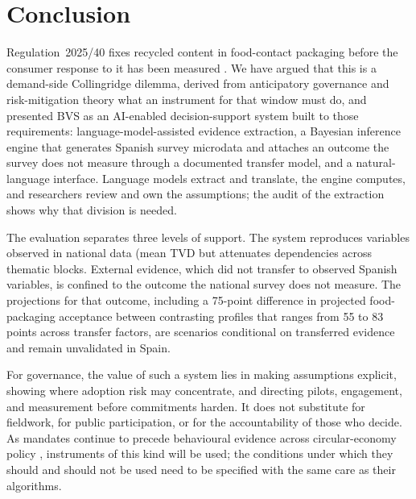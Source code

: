 \section{Conclusion}
\label{sec:conclusion}

Regulation~2025/40 fixes recycled content in food-contact packaging before the
consumer response to it has been measured \citep{eu2025}. We have argued that
this is a demand-side Collingridge dilemma, derived from anticipatory
governance and risk-mitigation theory what an instrument for that window must
do, and presented BVS as an AI-enabled decision-support system built to those
requirements: language-model-assisted evidence extraction, a Bayesian
inference engine that generates Spanish survey microdata and attaches an
outcome the survey does not measure through a documented transfer model, and a
natural-language interface. Language models extract and translate, the engine
computes, and researchers review and own the assumptions; the audit of the
extraction shows why that division is needed.

The evaluation separates three levels of support. The system reproduces
variables observed in national data (mean TVD %
but attenuates dependencies across thematic blocks. External evidence, which
did not transfer to observed Spanish variables, is confined to the outcome the
national survey does not measure. The projections for that outcome, including a 75-point difference in
projected food-packaging acceptance between contrasting profiles that ranges
from 55 to 83 points across transfer factors, are scenarios conditional on
transferred evidence and remain unvalidated in Spain.

For governance, the value of such a system lies in making assumptions
explicit, showing where adoption risk may concentrate, and directing pilots,
engagement, and measurement before commitments harden. It does not substitute
for fieldwork, for public participation, or for the accountability of those who
decide. As mandates continue to precede behavioural evidence across
circular-economy policy \citep{molenbuur2025}, instruments of this kind will be
used; the conditions under which they should and should not be used need to be
specified with the same care as their algorithms.

